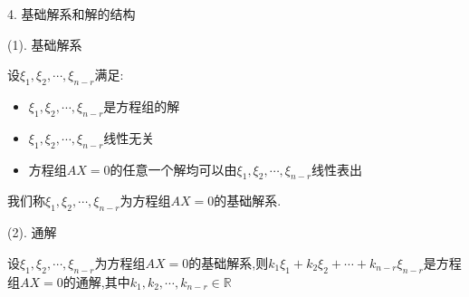 \begin{definition}[齐次方程组]
	4. 基础解系和解的结构
	
	(1). 基础解系
	
	设$\xi_{1},\xi_{2},\cdots,\xi_{n-r}$满足:  
	\begin{itemize}
		\item $\xi_{1},\xi_{2},\cdots,\xi_{n-r}\text{是方程组的解}$
		\item $\xi_{1},\xi_{2},\cdots,\xi_{n-r}\text{线性无关}$
		\item $\text{方程组}AX=0\text{的任意一个解均可以由}\xi_{1},\xi_{2},\cdots,\xi_{n-r}\text{线性表出}$
	\end{itemize}
	
	我们称$\xi_{1},\xi_{2},\cdots,\xi_{n-r}$为方程组$AX=0$的基础解系.
	
	(2). 通解
	
	设$\xi_{1},\xi_{2},\cdots,\xi_{n-r}$为方程组$AX=0$的基础解系,则$k_{1}\xi_{1}+k_{2}\xi_{2}+\cdots+k_{n-r}\xi_{n-r}$是方程组$AX=0$的通解,其中$k_{1},k_{2},\cdots,k_{n-r}\in \mathbb{R}$
\end{definition}
